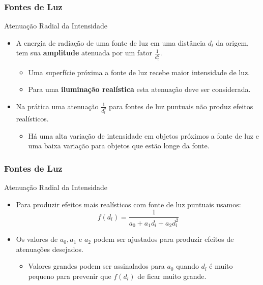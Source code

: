 \documentclass{beamer}
\begin{document}
\begin{frame}
\frametitle{Fontes de Luz}

	\begin{block}{Atenuação Radial da Intensidade}
		\begin{itemize}
			\item A energia de radiação de uma fonte de luz em uma distância $d_l$ da origem, tem sua \textbf{amplitude} atenuada  por um fator $\frac{1}{d^{2}_{l}}$.
			\begin{itemize}
				\item Uma superfície próxima a fonte de luz recebe maior intensidade de luz.
				\item Para uma \textbf{iluminação realística} esta atenuação deve ser considerada.
			\end{itemize}
			\item Na prática uma atenuação $\frac{1}{d^{2}_{l}}$ para fontes de luz puntuais não produz efeitos realísticos.
			\begin{itemize}
				\item Há uma alta variação de intensidade em objetos próximos a fonte de luz e uma baixa variação para objetos que estão longe da fonte.
			\end{itemize}
		\end{itemize}
	\end{block}
\end{frame}

\begin{frame}
\frametitle{Fontes de Luz}

	\begin{block}{Atenuação Radial da Intensidade}
		\begin{itemize}
			\item Para produzir efeitos mais realísticos com fonte de luz puntuais usamos:
				\begin{equation*}
					f(d_l) = \frac{1}{a_0 + a_1d_l + a_2d^{2}_{l}}
				\end{equation*}
			\item Os valores de $a_0,a_1$ e $a_2$ podem ser ajustados para produzir efeitos de atenuações desejados.
			\begin{itemize}
				\item Valores grandes podem ser assinalados para $a_0$ quando $d_l$ é muito pequeno para prevenir que $f(d_l)$ de ficar muito grande.
			\end{itemize}
		\end{itemize}
	\end{block}
\end{frame}
\end{document}

